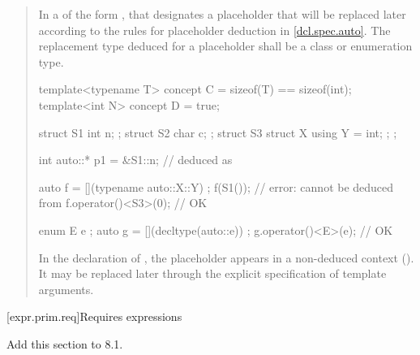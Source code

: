 \begin{quote}
\begin{addedblock}
\setcounter{Paras}{5}
\pnum
In a  of the form ,
that  designates a placeholder that 
will be replaced later according to the rules for placeholder deduction in
\ref{dcl.spec.auto}.
%
The replacement type deduced for a placeholder shall be a class or
enumeration type.
% 
\enterexample
\begin{codeblock}
template<typename T> concept C = sizeof(T) == sizeof(int);
template<int N> concept D = true;

struct S1 { int n; };
struct S2 { char c; };
struct S3 { struct X { using Y = int; }; };

int auto::* p1 = &S1::n; //  deduced as 

auto f = [](typename auto::X::Y) {};
f(S1()); // error:  cannot be deduced from 
f.operator()<S3>(0); // OK

enum E { e };
auto g = [](decltype(auto::e)) {};
g.operator()<E>(e);  // OK
\end{codeblock}
In the declaration of , the placeholder appears in a non-deduced 
context (). It may be replaced later through the
explicit specification of template arguments.
\exitexample
\end{addedblock}
\end{quote}


\setcounter{subsection}{6}
[expr.prim.req]{Requires expressions}

Add this section to 8.1.

